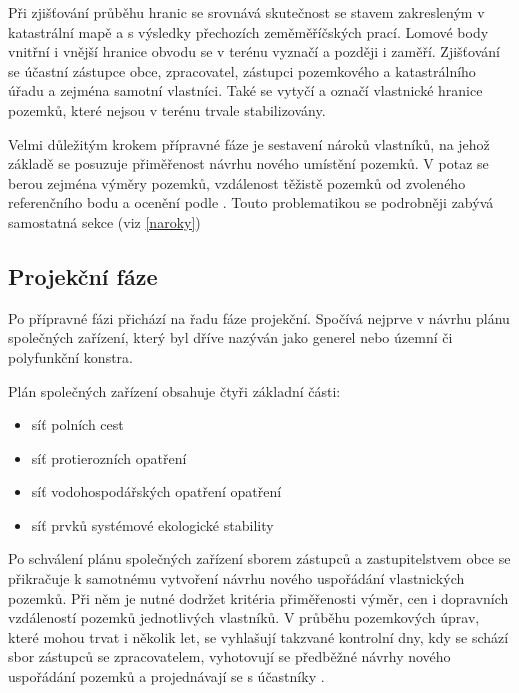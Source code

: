 Při zjišťování průběhu hranic se srovnává skutečnost se stavem zakresleným v katastrální mapě a s výsledky přechozích zeměměříčských prací. Lomové body vnitřní i vnější hranice obvodu se v terénu vyznačí a později i zaměří. Zjišťování se účastní zástupce obce, zpracovatel, zástupci pozemkového a katastrálního úřadu a zejména samotní vlastníci. Také se vytyčí a označí vlastnické hranice pozemků, které nejsou v terénu trvale stabilizovány.

Velmi důležitým krokem přípravné fáze je sestavení nároků vlastníků, na jehož základě se posuzuje přiměřenost návrhu nového umístění pozemků. V potaz se berou zejména výměry pozemků, vzdálenost těžistě pozemků od zvoleného referenčního bodu a ocenění podle . Touto problematikou se podrobněji zabývá samostatná sekce (viz \ref{naroky})

\subsection{Projekční fáze}
\label{projekcni_faze}

Po přípravné fázi přichází na řadu fáze projekční. Spočívá nejprve v návrhu plánu společných zařízení, který byl dříve nazýván jako generel nebo územní či polyfunkční konstra.

Plán společných zařízení obsahuje čtyři základní části:
	\begin{itemize}[leftmargin=1.5cm]
		\item síť polních cest
		\item síť protierozních opatření
		\item síť vodohospodářských opatření opatření
		\item síť prvků systémové ekologické stability
	\end{itemize}

Po schválení plánu společných zařízení sborem zástupců a zastupitelstvem obce se přikračuje k samotnému vytvoření návrhu nového uspořádání vlastnických pozemků. Při něm je nutné dodržet kritéria přiměřenosti výměr, cen i dopravních vzdáleností pozemků jednotlivých vlastníků. V průběhu pozemkových úprav, které mohou trvat i několik let, se vyhlašují takzvané kontrolní dny, kdy se schází sbor zástupců se zpracovatelem, vyhotovují se předběžné návrhy nového uspořádání pozemků a projednávají se s účastníky .

